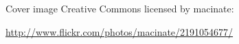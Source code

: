 Cover image Creative Commons licensed by macinate:

\url{http://www.flickr.com/photos/macinate/2191054677/}
